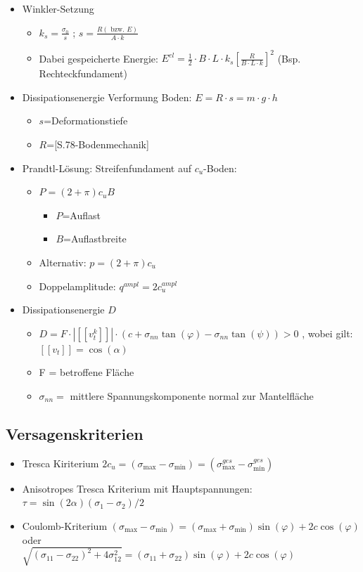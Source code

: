 \documentclass[fleqn,twoside]{article}
\newcommand{\abs}[1]{\ensuremath{\left\vert#1\right\vert}}
\begin{document}
\begin{itemize}
	\item Winkler-Setzung
	\begin{itemize}
		\item $k_s=\frac{\sigma_0}{s}$ ; $s=\frac{R (\text{ bzw. }E)}{A \cdot k}$
		\item Dabei gespeicherte Energie: $E^{el}=\frac{1}{2}\cdot B\cdot L\cdot k_s\left[\frac{R}{B\cdot L\cdot k}\right]^2$ (Bsp. Rechteckfundament)
	\end{itemize}
\item Dissipationsenergie Verformung Boden: $E=R\cdot s= m\cdot g\cdot h$
	\begin{itemize}
		\item $s$=Deformationstiefe
		\item $R$=[S.78-Bodenmechanik]
\end{itemize}
\item Prandtl-Lösung: Streifenfundament auf $c_u$-Boden:
\begin{itemize}
	\item $P=(2+\pi)c_u B$
	\begin{itemize}
		\item $P$=Auflast
		\item $B$=Auflastbreite
	\end{itemize}
	\item Alternativ: $p=(2+\pi)c_u$
	\item Doppelamplitude: $q^{ampl}=2c^{ampl}_u$
\end{itemize}
\item Dissipationsenergie $D$
\begin{itemize}
	\item $D= F \cdot \abs{ [[ v_t^k ]] } \cdot (c + \sigma_{nn} \tan(\varphi) - \sigma_{nn} \tan(\psi))>0$ , wobei gilt: $[[ v_t ]] = \cos(\alpha)$
	\item F = betroffene Fläche
	\item $\sigma_{nn} =$ mittlere Spannungskomponente normal zur Mantelfläche
	\end{itemize}
\end{itemize}

\subsection{Versagenskriterien}

\begin{itemize}
	\item Tresca Kiriterium
		$2c_u = (\sigma_{\max}-\sigma_{\min})=(\sigma_{\max}^{ges}-\sigma_{\min}^{ges})$
	\item Anisotropes Tresca Kriterium mit Hauptspannungen: $\tau = \sin(2 \alpha) (\sigma_1 - \sigma_2)/2$
	\item Coulomb-Kriterium
		$(\sigma_{\max}-\sigma_{\min})=(\sigma_{\max}+\sigma_{\min})\sin(\varphi)+2c\cos(\varphi)$
		oder\\
		$\sqrt{(\sigma_{11}-\sigma_{22})^2+4\sigma^{2}_{12}}=(\sigma_{11}+\sigma_{22})\sin(\varphi)+2c\cos(\varphi)$
\end{itemize}
\end{document}
